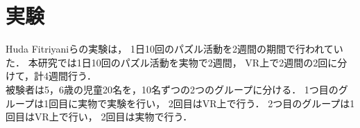 \section{実験}
  Huda Fitriyaniらの実験\cite{puzzle}は，
  1日10回のパズル活動を2週間の期間で行われていた．
  本研究では1日10回のパズル活動を実物で2週間，
  VR上で2週間の2回に分けて，計4週間行う．
  \\\indent
  被験者は5，6歳の児童20名を，10名ずつの2つのグループに分ける．
  1つ目のグループは1回目に実物で実験を行い，
  2回目はVR上で行う．
  2つ目のグループは1回目はVR上で行い，
  2回目は実物で行う．
